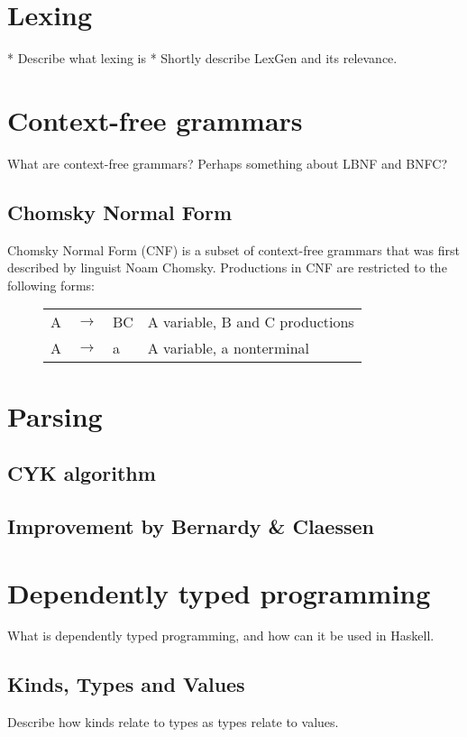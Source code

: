 \documentclass[a4paper,12pt,twosided]{report}
\begin{document}
\section{Lexing}
* Describe what lexing is
* Shortly describe LexGen and its relevance.

\section{Context-free grammars}
What are context-free grammars? Perhaps something about LBNF and BNFC?

\subsection{Chomsky Normal Form}
Chomsky Normal Form (CNF) is a subset of context-free grammars that was first
described by linguist Noam Chomsky. Productions in CNF are restricted to the
following forms:

\begin{figure}
\begin{tabular}{l l l l}
    A & $\rightarrow$ & BC & A variable, B and C productions \\
    A & $\rightarrow$ & a & A variable, a nonterminal \\
\end{tabular}
\end{figure}

\section{Parsing}
\subsection{CYK algorithm}
\subsection{Improvement by Bernardy \& Claessen}

\section{Dependently typed programming}
What is dependently typed programming, and how can it be used in Haskell.
\subsection{Kinds, Types and Values}
Describe how kinds relate to types as types relate to values.
\end{document}
